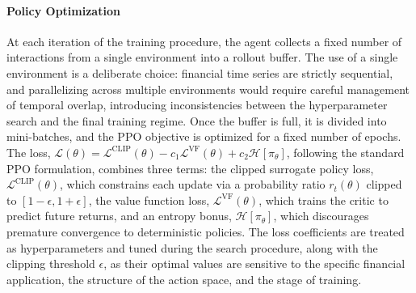 \paragraph{Policy Optimization} At each iteration of the training procedure, the agent collects a fixed number of interactions from a single environment into a rollout buffer. The use of a single environment is a deliberate choice: financial time series are strictly sequential, and parallelizing across multiple environments would require careful management of temporal overlap, introducing inconsistencies between the hyperparameter search and the final training regime. Once the buffer is full, it is divided into mini-batches, and the PPO objective is optimized for a fixed number of epochs. The loss, $\mathcal{L}(\theta) = \mathcal{L}^{\text{CLIP}}(\theta) - c_1\mathcal{L}^{\text{VF}}(\theta) + c_2\mathcal{H}[\pi_\theta]$, following the standard PPO formulation, combines three terms: the clipped surrogate policy loss, $\mathcal{L}^{\text{CLIP}}(\theta)$, which constrains each update via a probability ratio $r_t(\theta)$ clipped to $[1-\epsilon, 1+\epsilon]$, the value function loss, $\mathcal{L}^{\text{VF}}(\theta)$, which trains the critic to predict future returns, and an entropy bonus, $\mathcal{H}[\pi_\theta]$, which discourages premature convergence to deterministic policies. The loss coefficients are treated as hyperparameters and tuned during the search procedure, along with the clipping threshold $\epsilon$, as their optimal values are sensitive to the specific financial application, the structure of the action space, and the stage of training.

